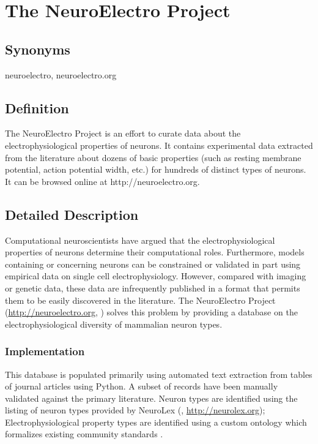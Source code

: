 \documentclass[12pt]{article}
\begin{document}
\section*{The NeuroElectro Project}

\subsection*{Synonyms}
neuroelectro, neuroelectro.org

\subsection*{Definition}
The NeuroElectro Project is an effort to curate data about the electrophysiological properties
of neurons.  It contains experimental data extracted from the literature about dozens of
basic properties (such as resting membrane potential, action potential width, etc.) for hundreds of distinct types of neurons.  It can be browsed online at http://neuroelectro.org.  

\subsection*{Detailed Description}
Computational neuroscientists have argued that the electrophysiological properties of neurons determine their computational roles.
Furthermore, models containing or concerning neurons can be constrained or validated in part using empirical data on single cell electrophysiology.
However, compared with imaging or genetic data, these data are infrequently published in a format that permits them to be easily discovered in the literature.
The NeuroElectro Project (\url{http://neuroelectro.org}, \cite{neuroelectro_2013}) solves this problem by providing a database on the electrophysiological diversity of mammalian neuron types.

\subsubsection*{Implementation}
This database is populated primarily using automated text extraction from tables of journal articles using Python.
A subset of records have been manually validated against the primary literature.
Neuron types are identified using the listing of neuron types provided by NeuroLex (\cite{larson_neurolex.org:_2013,hamilton_ontological_2012}, \url{http://neurolex.org});
Electrophysiological property types are identified using a custom ontology which formalizes existing community standards \cite{ascoli_petilla_2008}.
\end{document}
